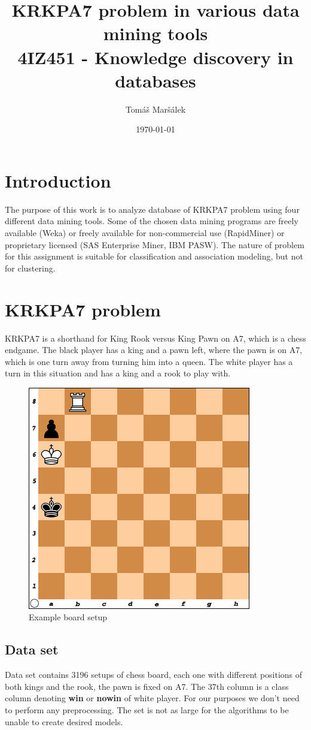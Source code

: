 \documentclass[11pt]{article}
\title{KRKPA7 problem in various data mining tools \\ 4IZ451 - Knowledge discovery in databases}
\author{Tomáš Maršálek}
\date{\today}
\begin{document}
\maketitle
\thispagestyle{empty}
\clearpage

\section{Introduction}
The purpose of this work is to analyze database of KRKPA7 problem using four
different data mining tools. Some of the chosen data mining programs are freely
available (Weka) or freely available for non-commercial use (RapidMiner) or
proprietary licensed (SAS Enterprise Miner, IBM PASW). %
The nature of problem for this assignment is suitable for classification and
association modeling, but not for clustering.

\section{KRKPA7 problem}
KRKPA7 is a shorthand for King Rook versus King Pawn on A7, which is a chess
endgame. The black player has a king and a pawn left, where the pawn is on A7,
which is one turn away from turning him into a queen. The white player has a
turn in this situation and has a king and a rook to play with.

\begin{figure}[!ht]
	\centering
	\includegraphics[width=.7\textwidth]{example}
	\caption{Example board setup}
\end{figure}

\clearpage

\subsection{Data set}
Data set contains 3196 setups of chess board, each one with different positions
of both kings and the rook, the pawn is fixed on A7. The 37th column is a class
column denoting {\bf win} or {\bf nowin} of white player. For our purposes we
don't need to perform any preprocessing. The set is not as large for the
algorithms to be unable to create desired models.
\end{document}
